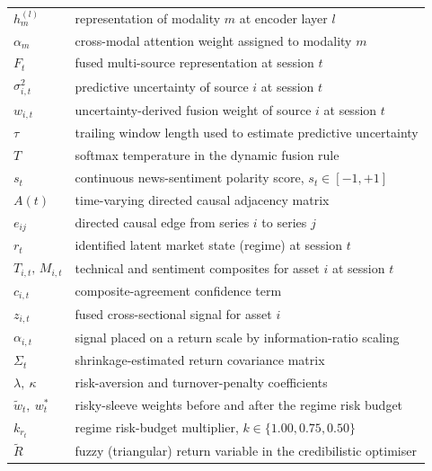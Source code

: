\begin{center}
\small
{}
\begin{tabular}{@{}p{3.0cm}L{10.0cm}@{}}
$h_m^{(l)}$ & representation of modality $m$ at encoder layer $l$ \\
$\alpha_m$ & cross-modal attention weight assigned to modality $m$ \\
$F_t$ & fused multi-source representation at session $t$ \\
$\sigma_{i,t}^2$ & predictive uncertainty of source $i$ at session $t$ \\
$w_{i,t}$ & uncertainty-derived fusion weight of source $i$ at session $t$ \\
$\tau$ & trailing window length used to estimate predictive uncertainty \\
$T$ & softmax temperature in the dynamic fusion rule \\
$s_t$ & continuous news-sentiment polarity score, $s_t \in [-1,+1]$ \\
$A(t)$ & time-varying directed causal adjacency matrix \\
$e_{ij}$ & directed causal edge from series $i$ to series $j$ \\
$r_t$ & identified latent market state (regime) at session $t$ \\
$T_{i,t},\, M_{i,t}$ & technical and sentiment composites for asset $i$ at session $t$ \\
$c_{i,t}$ & composite-agreement confidence term \\
$z_{i,t}$ & fused cross-sectional signal for asset $i$ \\
$\alpha_{i,t}$ & signal placed on a return scale by information-ratio scaling \\
$\Sigma_t$ & shrinkage-estimated return covariance matrix \\
$\lambda,\ \kappa$ & risk-aversion and turnover-penalty coefficients \\
$\tilde{w}_t,\ w_t^{*}$ & risky-sleeve weights before and after the regime risk budget \\
$k_{r_t}$ & regime risk-budget multiplier, $k \in \{1.00, 0.75, 0.50\}$ \\
$\tilde{R}$ & fuzzy (triangular) return variable in the credibilistic optimiser \\
\end{tabular}
\end{center}
